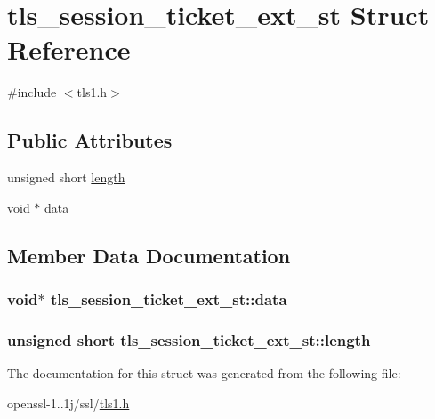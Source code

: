 \hypertarget{structtls__session__ticket__ext__st}{\section{tls\-\_\-session\-\_\-ticket\-\_\-ext\-\_\-st Struct Reference}
\label{structtls__session__ticket__ext__st}
}


{\ttfamily \#include $<$tls1.\-h$>$}

\subsection*{Public Attributes}
\begin{DoxyCompactItemize}
\item 
unsigned short \hyperlink{structtls__session__ticket__ext__st_ab4a3be707090c71d78abec6456b8a3a9}{length}
\item 
void $\ast$ \hyperlink{structtls__session__ticket__ext__st_a06405cfdcffe766026c389d9499602a9}{data}
\end{DoxyCompactItemize}


\subsection{Member Data Documentation}
\hypertarget{structtls__session__ticket__ext__st_a06405cfdcffe766026c389d9499602a9}{
\subsubsection[{data}]{\setlength{\rightskip}{0pt plus 5cm}void$\ast$ tls\-\_\-session\-\_\-ticket\-\_\-ext\-\_\-st\-::data}}\label{structtls__session__ticket__ext__st_a06405cfdcffe766026c389d9499602a9}
\hypertarget{structtls__session__ticket__ext__st_ab4a3be707090c71d78abec6456b8a3a9}{
\subsubsection[{length}]{\setlength{\rightskip}{0pt plus 5cm}unsigned short tls\-\_\-session\-\_\-ticket\-\_\-ext\-\_\-st\-::length}}\label{structtls__session__ticket__ext__st_ab4a3be707090c71d78abec6456b8a3a9}


The documentation for this struct was generated from the following file\-:\begin{DoxyCompactItemize}
\item 
openssl-\/1..\-1j/ssl/\hyperlink{tls1_8h}{tls1.\-h}\end{DoxyCompactItemize}
